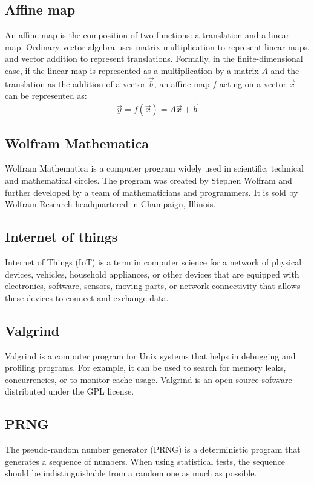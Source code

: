 \documentclass[thesis=M,english]{FITthesis}[2019/12/23]
\begin{document}
\subsection{Affine map}
An affine map is the composition of two functions: a translation and a linear map. Ordinary vector algebra uses matrix multiplication to represent linear maps, and vector addition to represent translations. Formally, in the finite-dimensional case, if the linear map is represented as a multiplication by a matrix $A$ and the translation as the addition of a vector $\vec {b}$, an affine map $f$ acting on a vector ${\vec {x}}$ can be represented as:
\[
{\vec {y}}=f({\vec {x}})=A{\vec {x}}+{\vec {b}}
\]

\subsection{Wolfram Mathematica}
Wolfram Mathematica is a computer program widely used in scientific, technical and mathematical circles. The program was created by Stephen Wolfram and further developed by a team of mathematicians and programmers. It is sold by Wolfram Research headquartered in Champaign, Illinois.

\subsection{Internet of things}
Internet of Things (IoT) is a term in computer science for a network of physical devices, vehicles, household appliances, or other devices that are equipped with electronics, software, sensors, moving parts, or network connectivity that allows these devices to connect and exchange data.

\subsection{Valgrind}
Valgrind is a computer program for Unix systems that helps in debugging and profiling programs. For example, it can be used to search for memory leaks, concurrencies, or to monitor cache usage. Valgrind is an open-source software distributed under the GPL license.

\subsection{PRNG}
The pseudo-random number generator (PRNG) is a deterministic program that generates a sequence of numbers. When using statistical tests, the sequence should be indistinguishable from a random one as much as possible.
\end{document}
